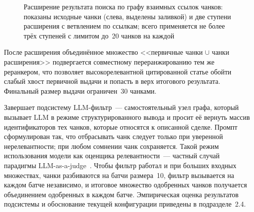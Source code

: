 \begin{figure}[H]
\centering
{}
\caption{Расширение результата поиска по графу взаимных ссылок чанков: показаны исходные чанки (слева, выделены заливкой) и две ступени расширения с ветвлением по ссылкам; всего применяется не более трёх ступеней с лимитом до~20 чанков на каждой}
\label{fig:ref-graph}
\end{figure}

После расширения объединённое множество <<первичные чанки $\cup$ чанки расширения>> подвергается совместному переранжированию тем же реранкером, что позволяет высокорелевантной цитированной статье обойти слабый хвост первичной выдачи и попасть в верх итогового результата. Финальный размер выдачи ограничен~30 чанками.

Завершает подсистему LLM-фильтр~--- самостоятельный узел графа, который вызывает LLM в режиме структурированного вывода и просит её вернуть массив идентификаторов тех чанков, которые относятся к описанной сделке. Промпт сформулирован так, что отбрасывать чанк следует только при уверенной нерелевантности; при любом сомнении чанк сохраняется. Такой режим использования модели как оценщика релевантности~--- частный случай парадигмы LLM-as-a-judge~\cite{zheng2023judging}. Чтобы фильтр работал и при больших входных множествах, чанки разбиваются на батчи размера~10, фильтр вызывается на каждом батче независимо, и итоговое множество одобренных чанков получается объединением одобренных в каждом батче. Эмпирическая оценка результатов подсистемы и обоснование текущей конфигурации приведены в подразделе~2.4.

